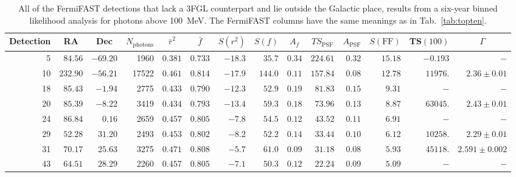 \documentclass[useAMS,usenatbib]{mn2e}
\begin{document}
\begin{table}
  \caption{ All of the FermiFAST detections that lack a 3FGL
    counterpart and lie outside the Galactic place, results from a
    six-year binned likelihood analysis for photons above 100~MeV.
    The FermiFAST columns have the same meanings as in
    Tab.~\ref{tab:topten}.}
  \label{tab:fermisig100MeV}
\begin{tabular}{rrrrrrrrrrrrrr}
    \hline
    \multicolumn{1}{c}{Detection} & \multicolumn{1}{c}{RA} & \multicolumn{1}{c}{Dec}  & \multicolumn{1}{c}{$N_\mathrm{photons}$}  &\multicolumn{1}{c}{$\bar r^2$} & \multicolumn{1}{c}{$\bar f$} & \multicolumn{1}{c}{$S(r^2)$} & \multicolumn{1}{c}{$S(f)$} & \multicolumn{1}{c}{$A_f$} & \multicolumn{1}{c}{$TS_\mathrm{PSF}$} & \multicolumn{1}{c}{$A_\mathrm{PSF}$} & \multicolumn{1}{c}{$S(\mathrm{FF})$} & \multicolumn{1}{c}{TS$(100)$}  & \multicolumn{1}{c}{$\Gamma$} 
 \\
 \hline
 5 & $ 84.56$ & $-69.20$ &   1960 & $0.381$ & $0.733$ & $ -18.3$ & $  35.7$ & $0.34$ & $   224.61$ & $0.32$ & $    15.18$ & $-0.193$ & $-$ \\ 
10 & $232.90$ & $-56.21$ &  17522 & $0.461$ & $0.814$ & $ -17.9$ & $ 144.0$ & $0.11$ & $   157.84$ & $0.08$ & $    12.78$ & $11976.$ & $2.36\pm0.01$ \\
18 & $ 85.43$ & $ -1.94$ &   2775 & $0.433$ & $0.790$ & $ -12.3$ & $  52.9$ & $0.19$ & $    81.83$ & $0.15$ & $     9.31$ & $-$  & $-$ \\ 
20 & $ 85.39$ & $ -8.22$ &   3419 & $0.434$ & $0.793$ & $ -13.4$ & $  59.3$ & $0.18$ & $    73.96$ & $0.13$ & $     8.87$ & $63045.$ & $2.43\pm0.01$ \\ 
24 & $ 86.84$ & $  0.16$ &   2659 & $0.457$ & $0.805$ & $  -7.8$ & $  54.5$ & $0.12$ & $    43.52$ & $0.11$ & $     6.91$ & $-$  & $-$ \\
29 & $ 52.28$ & $ 31.20$ &   2493 & $0.453$ & $0.802$ & $  -8.2$ & $  52.2$ & $0.14$ & $    33.44$ & $0.10$ & $     6.12$ & $10258.$ & $2.29\pm0.01$ \\ 
31 & $ 70.17$ & $ 25.63$ &   3275 & $0.471$ & $0.808$ & $  -5.7$ & $  61.0$ & $0.09$ & $    31.18$ & $0.08$ & $     5.93$ & $45118.$ & $2.591\pm0.002$ \\
43 & $ 64.51$ & $ 28.29$ &   2260 & $0.457$ & $0.805$ & $  -7.1$ & $  50.3$ & $0.12$ & $    22.24$ & $0.09$ & $     5.09$ & $-$  & $-$ \\ 
\end{tabular}
\end{table}
\end{document}

